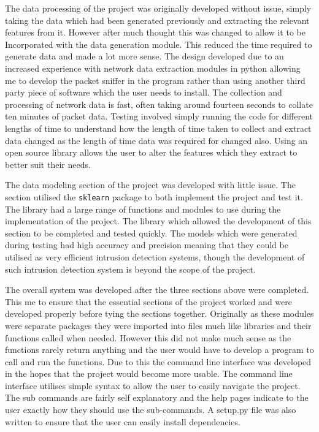 The data processing of the project was originally developed without issue, simply taking the data which had been generated previously and extracting the relevant features from it. However after much thought this was changed to allow it to be Incorporated with the data generation module. This reduced the time required to generate data and made a lot more sense. The design developed due to an increased experience with network data extraction modules in python allowing me to develop the packet sniffer in the program rather than using another third party piece of software which the user needs to install. The collection and processing of network data is fast, often taking around fourteen seconds to collate ten minutes of packet data. Testing involved simply running the code for different lengths of time to understand how the length of time taken to collect and extract data changed as the length of time data was required for changed also. Using an open source library allows the user to alter the features which they extract to better suit their needs.

The data modeling section of the project was developed with little issue. The section utilised the \texttt{sklearn} package to both implement the project and test it. The library had a large range of functions and modules to use during the implementation of the project. The library which allowed the development of this section to be completed and tested quickly. The models which were generated during testing had high accuracy and precision meaning that they could be utilised as very efficient intrusion detection systems, though the development of such intrusion detection system is beyond the scope of the project. 

The overall system was developed after the three sections above were completed. This me to ensure that the essential sections of the project worked and were developed properly before tying the sections together. Originally as these modules were separate packages they were imported into files much like libraries and their functions called when needed. However this did not make much sense as the functions rarely return anything and the user would have to develop a program to call and run the functions. Due to this the command line interface was developed in the hopes that the project would become more usable. The command line interface utilises simple syntax to allow the user to easily navigate the project. The sub commands are fairly self explanatory and the help pages indicate to the user exactly how they should use the sub-commands. A setup.py file was also written to ensure that the user can easily install dependencies.

